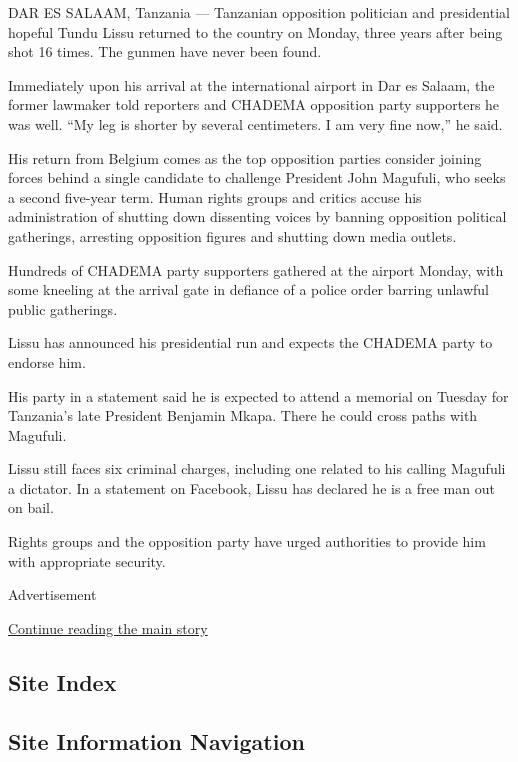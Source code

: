 DAR ES SALAAM, Tanzania --- Tanzanian opposition politician and
presidential hopeful Tundu Lissu returned to the country on Monday,
three years after being shot 16 times. The gunmen have never been found.

Immediately upon his arrival at the international airport in Dar es
Salaam, the former lawmaker told reporters and CHADEMA opposition party
supporters he was well. ``My leg is shorter by several centimeters. I am
very fine now,'' he said.

His return from Belgium comes as the top opposition parties consider
joining forces behind a single candidate to challenge President John
Magufuli, who seeks a second five-year term. Human rights groups and
critics accuse his administration of shutting down dissenting voices by
banning opposition political gatherings, arresting opposition figures
and shutting down media outlets.

Hundreds of CHADEMA party supporters gathered at the airport Monday,
with some kneeling at the arrival gate in defiance of a police order
barring unlawful public gatherings.

Lissu has announced his presidential run and expects the CHADEMA party
to endorse him.

His party in a statement said he is expected to attend a memorial on
Tuesday for Tanzania's late President Benjamin Mkapa. There he could
cross paths with Magufuli.

Lissu still faces six criminal charges, including one related to his
calling Magufuli a dictator. In a statement on Facebook, Lissu has
declared he is a free man out on bail.

Rights groups and the opposition party have urged authorities to provide
him with appropriate security.

Advertisement

\protect\hyperlink{after-bottom}{Continue reading the main story}

\hypertarget{site-index}{%
\subsection{Site Index}\label{site-index}}

\hypertarget{site-information-navigation}{%
\subsection{Site Information
Navigation}\label{site-information-navigation}}

